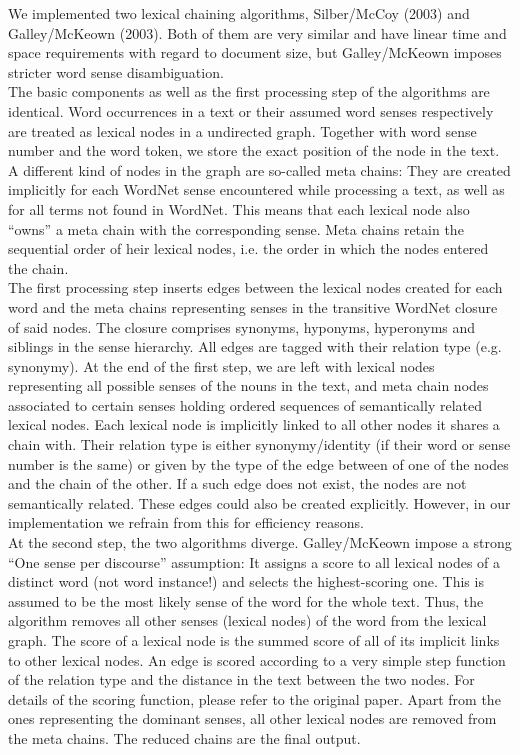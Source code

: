 \documentclass[11pt, a4paper, abstraction]{scrartcl}
\begin{document}
We implemented two lexical chaining algorithms, Silber/McCoy (2003) and Galley/McKeown (2003). Both of them are very similar and have linear time and space requirements with regard to document size, but Galley/McKeown imposes stricter word sense disambiguation. \\
The basic components as well as the first processing step of the algorithms are identical. Word occurrences in a text or their assumed word senses respectively are treated as lexical nodes in a undirected graph. Together with word sense number and the word token, we store the exact position of the node in the text. A different kind of nodes in the graph are so-called meta chains: They are created implicitly for each WordNet sense encountered while processing a text, as well as for all terms not found in WordNet. This means that each lexical node also ``owns'' a meta chain with the corresponding sense. Meta chains retain the sequential order of heir lexical nodes, i.e. the order in which the nodes entered the chain. \\
The first processing step inserts edges between the lexical nodes created for each word and the meta chains representing senses in the transitive WordNet closure of said nodes. The closure comprises synonyms, hyponyms, hyperonyms and siblings in the sense hierarchy. All edges are tagged with their relation type (e.g. synonymy). At the end of the first step, we are left with lexical nodes representing all possible senses of the nouns in the text, and meta chain nodes associated to certain senses holding ordered sequences of semantically related lexical nodes. Each lexical node is implicitly linked to all other nodes it shares a chain with. Their relation type is either synonymy/identity (if their word or sense number is the same) or given by the type of the edge between of one of the nodes and the chain of the other. If a such edge does not exist, the nodes are not semantically related. These edges could also be created explicitly. However, in our implementation we refrain from this for efficiency reasons. \\
At the second step, the two algorithms diverge. Galley/McKeown impose a strong ``One sense per discourse'' assumption: It assigns a score to all lexical nodes of a distinct word (not word instance!) and selects the highest-scoring one. This is assumed to be the most likely sense of the word for the whole text. Thus, the algorithm removes all other senses (lexical nodes) of the word from the lexical graph. The score of a lexical node is the summed score of all of its implicit links to other lexical nodes. An edge is scored according to a very simple step function of the relation type and the distance in the text between the two nodes. For details of the scoring function, please refer to the original paper. Apart from the ones representing the dominant senses, all other lexical nodes are removed from the meta chains. The reduced chains are the final output. \\
\end{document}
